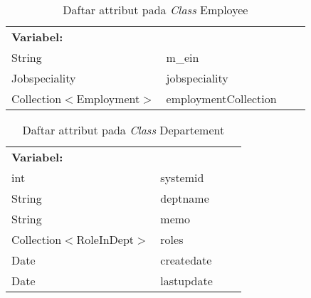\begin{table}[H]
	\caption{Daftar attribut pada \textit{Class} Employee}
	\centering
	\small
	\begin{adjustbox}{width=1\textwidth}	
		\begin{tabular}{|p{4cm} p{2.1cm} p{3cm} p{3.1cm}|}
			\hline
			\multicolumn{2}{|l}{\textbf{Variabel:}}&\multicolumn{2}{l|}{}\\
			String&m\_ein&&\\
			Jobspeciality&jobspeciality&&\\
			Collection$<$Employment$>$&employmentCollection&&\\
			\hline
		\end{tabular}
	\end{adjustbox}
\end{table}
\begin{table}[H]
	\caption{Daftar attribut pada \textit{Class} Departement}
	\centering
	\small
	\begin{adjustbox}{width=1\textwidth}	
		\begin{tabular}{|p{4cm} p{2.1cm} p{3cm} p{3.1cm}|}
			\hline
			\multicolumn{2}{|l}{\textbf{Variabel:}}&\multicolumn{2}{l|}{\textbf{}}\\
			int&systemid&&\\
			String&deptname&&\\
			String&memo&&\\
			Collection$<$RoleInDept$>$&roles&&\\
			Date&createdate&&\\
			Date&lastupdate&&\\
			\hline
		\end{tabular}
	\end{adjustbox}
\end{table}
